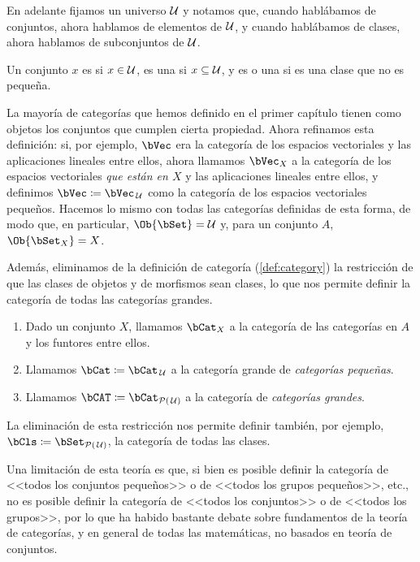 En adelante fijamos un universo $\mathcal{U}$ y notamos que, cuando hablábamos de
conjuntos, ahora hablamos de elementos de $\mathcal{U}$, y cuando hablábamos de
clases, ahora hablamos de subconjuntos de $\mathcal{U}$.

\begin{definition}
  Un conjunto $x$ es  si $x\in\mathcal{U}$, es una  si
  $x\subseteq\mathcal{U}$, y es  o una  si es una
  clase que no es pequeña.
\end{definition}

La mayoría de categorías que hemos definido en el primer capítulo tienen como
objetos los conjuntos que cumplen cierta propiedad. Ahora refinamos esta
definición: si, por ejemplo, $\bVec$ era la categoría de los espacios
vectoriales y las aplicaciones lineales entre ellos, ahora llamamos $\bVec_X$ a
la categoría de los espacios vectoriales \emph{que están en $X$} y las
aplicaciones lineales entre ellos, y definimos $\bVec\coloneqq\bVec_{\,\UNIVERSE}$
como la categoría de los espacios vectoriales pequeños. Hacemos lo mismo con
todas las categorías definidas de esta forma, de modo que, en particular,
$\Ob{\bSet}=\UNIVERSE$ y, para un conjunto $A$, $\Ob{\bSet_X}=X$.

Además, eliminamos de la definición de categoría (\ref{def:category}) la
restricción de que las clases de objetos y de morfismos sean clases, lo que nos
permite definir la categoría de todas las categorías grandes.

\begin{definition}\;
  \begin{enumerate}
  \item Dado un conjunto $X$, llamamos $\bCat_X$ a la categoría de las categorías
    en $A$ y los funtores entre ellos.
  \item Llamamos $\bCat\coloneqq\bCat_{\,\UNIVERSE}$ a la categoría grande de
    \emph{categorías pequeñas}.
  \item Llamamos $\bCAT\coloneqq\bCat_{\power{(\,\UNIVERSE)}}$ a la categoría de
    \emph{categorías grandes}.
  \end{enumerate}
\end{definition}

La eliminación de esta restricción nos permite definir también, por ejemplo,
$\bCls\coloneqq\bSet_{\power{(\,\UNIVERSE)}}$, la categoría de todas las clases.

Una limitación de esta teoría es que, si bien es posible definir la categoría de
<<todos los conjuntos pequeños>> o de <<todos los grupos pequeños>>, etc., no es
posible definir la categoría de <<todos los conjuntos>> o de <<todos los grupos>>,
por lo que ha habido bastante debate sobre fundamentos de la teoría de categorías,
y en general de todas las matemáticas, no basados en teoría de conjuntos.

